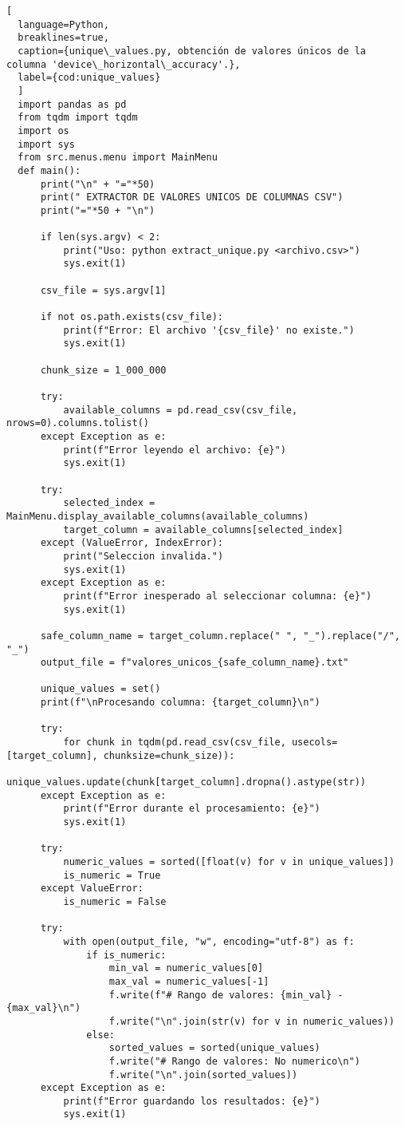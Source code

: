 \begin{lstlisting}[
  language=Python,
  breaklines=true,
  caption={unique\_values.py, obtención de valores únicos de la columna 'device\_horizontal\_accuracy'.},
  label={cod:unique_values}
  ]
  import pandas as pd
  from tqdm import tqdm
  import os
  import sys
  from src.menus.menu import MainMenu
  def main():
      print("\n" + "="*50)
      print(" EXTRACTOR DE VALORES UNICOS DE COLUMNAS CSV")
      print("="*50 + "\n")

      if len(sys.argv) < 2:
          print("Uso: python extract_unique.py <archivo.csv>")
          sys.exit(1)

      csv_file = sys.argv[1]

      if not os.path.exists(csv_file):
          print(f"Error: El archivo '{csv_file}' no existe.")
          sys.exit(1)

      chunk_size = 1_000_000

      try:
          available_columns = pd.read_csv(csv_file, nrows=0).columns.tolist()
      except Exception as e:
          print(f"Error leyendo el archivo: {e}")
          sys.exit(1)

      try:
          selected_index = MainMenu.display_available_columns(available_columns)
          target_column = available_columns[selected_index]
      except (ValueError, IndexError):
          print("Seleccion invalida.")
          sys.exit(1)
      except Exception as e:
          print(f"Error inesperado al seleccionar columna: {e}")
          sys.exit(1)

      safe_column_name = target_column.replace(" ", "_").replace("/", "_")
      output_file = f"valores_unicos_{safe_column_name}.txt"

      unique_values = set()
      print(f"\nProcesando columna: {target_column}\n")

      try:
          for chunk in tqdm(pd.read_csv(csv_file, usecols=[target_column], chunksize=chunk_size)):
              unique_values.update(chunk[target_column].dropna().astype(str))
      except Exception as e:
          print(f"Error durante el procesamiento: {e}")
          sys.exit(1)

      try:
          numeric_values = sorted([float(v) for v in unique_values])
          is_numeric = True
      except ValueError:
          is_numeric = False

      try:
          with open(output_file, "w", encoding="utf-8") as f:
              if is_numeric:
                  min_val = numeric_values[0]
                  max_val = numeric_values[-1]
                  f.write(f"# Rango de valores: {min_val} - {max_val}\n")
                  f.write("\n".join(str(v) for v in numeric_values))
              else:
                  sorted_values = sorted(unique_values)
                  f.write("# Rango de valores: No numerico\n")
                  f.write("\n".join(sorted_values))
      except Exception as e:
          print(f"Error guardando los resultados: {e}")
          sys.exit(1)


\end{lstlisting}
